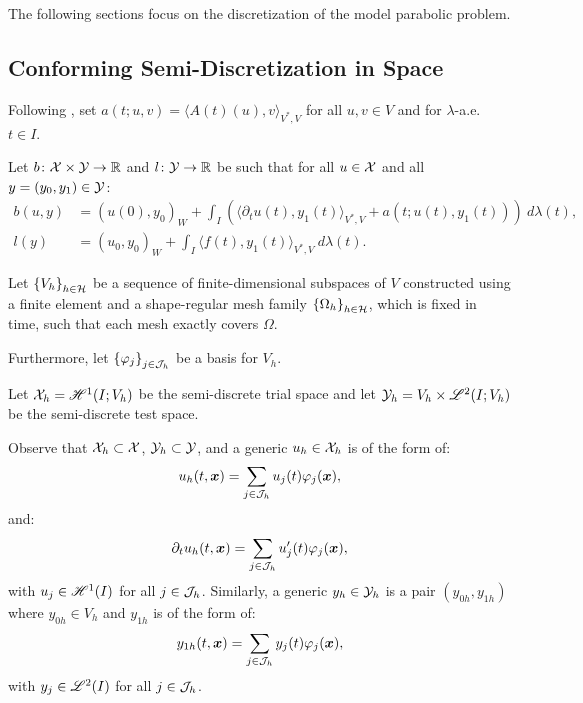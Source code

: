 The following sections focus on the discretization of the model parabolic problem.

\subsection{Conforming Semi-Discretization in Space} \label{subsection:space_discretization}

Following \cite[p.~135]{Ern2021}, set $a(t; u, v) = \langle A(t)(u), v \rangle_{V^*, V}$ for all $u, v \in V$ and for $\lambda$-a.e. $t \in I$.

\begin{definition}[$b$ and $l$]
    Let $b \colon \mathcal{X} \times \mathcal{Y} \rightarrow \mathbb{R}$ and $l \colon \mathcal{Y} \rightarrow \mathbb{R}$ be such that for all $u \in \mathcal{X}$ and all $y = (y_0, y_1) \in \mathcal{Y}$:
    \begin{align}
        b(u, y) &= \left( u(0), y_0 \right)_W + \int_I \left( \langle \partial_t u(t), y_1(t) \rangle_{V^*, V} + a(t; u(t), y_1(t)) \right)~ d \lambda(t), \\
        l(y) &= \left( u_0, y_0 \right)_W + \int_I \langle f(t), y_1(t) \rangle_{V^*, V} ~ d \lambda(t).
    \end{align}
\end{definition}

Let $\left\{ V_h \right\}_{h \in \mathcal{H}}$ be a sequence of finite-dimensional subspaces of $V$ constructed using a finite element and a shape-regular mesh family $\left\{ \Omega_{h} \right\}_{h \in \mathcal{H}}$, which is fixed in time, such that each mesh exactly covers $\Omega$.

Furthermore, let $\left\{ \varphi_j \right\}_{j \in \mathcal{J}_h}$ be a basis for $V_h$.

\begin{definition}
    Let $\mathcal{X}_h = \mathscr{H}^{1}(I; V_h)$ be the semi-discrete trial space and let $\mathcal{Y}_h = V_h \times \mathscr{L}^{2}(I; V_h)$ be the semi-discrete test space.
\end{definition}

Observe that $\mathcal{X}_h \subset \mathcal{X}$, $\mathcal{Y}_h \subset \mathcal{Y}$, and a generic $u_h \in \mathcal{X}_h$ is of the form of:
\begin{align}
    u_h(t, \bm{x}) = \sum_{j \in \mathcal{J}_h} u_j(t) \varphi_j(\bm{x}),
\end{align}
and:
\begin{align}
    \partial_t u_h(t, \bm{x}) = \sum_{j \in \mathcal{J}_h} u_j^{\prime}(t) \varphi_j(\bm{x}),
\end{align}
with $u_j \in \mathscr{H}^{1}(I)$ for all $j \in \mathcal{J}_h$. Similarly, a generic $y_h \in \mathcal{Y}_h$ is a pair $(y_{0h}, y_{1h})$ where $y_{0h} \in V_h$ and $y_{1h}$ is of the form of:
\begin{align}
    y_{1h}(t, \bm{x}) = \sum_{j \in \mathcal{J}_h} y_j(t) \varphi_j(\bm{x}),
\end{align}
with $y_j \in \mathscr{L}^{2}(I)$ for all $j \in \mathcal{J}_h$.

